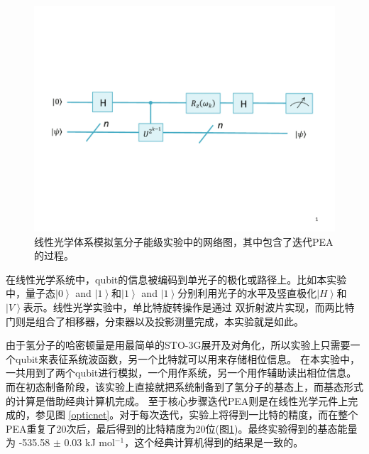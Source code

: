 \begin{figure}[htbp]
            \begin{center}
              \includegraphics[width= 0.8\columnwidth]{figures/simhydro.pdf}
              \caption{线性光学体系模拟氢分子能级实验中的网络图，其中包含了迭代PEA的过程。
               }\label{simhydro}
            \end{center}
 \end{figure}

在线性光学系统中，qubit的信息被编码到单光子的极化或路径上\cite{hydro1}。比如本实验中，量子态$\left\vert 0 \right\rangle$ and
$\left\vert 1 \right\rangle$和$\left\vert 1 \right\rangle$ and
$\left\vert 1 \right\rangle$分别利用光子的水平及竖直极化$\left\vert H \right\rangle$和$\left\vert V \right\rangle$表示。线性光学实验中，单比特旋转操作是通过
双折射波片实现，而两比特门则是组合了相移器，分束器以及投影测量完成，本实验就是如此。

由于氢分子的哈密顿量是用最简单的STO-3G展开及对角化，所以实验上只需要一个qubit来表征系统波函数，另一个比特就可以用来存储相位信息。
在本实验中，一共用到了两个qubit进行模拟，一个用作系统，另一个用作辅助读出相位信息。而在初态制备阶段，该实验上直接就把系统制备到了氢分子的基态上，而基态形式的计算是借助经典计算机完成。
至于核心步骤迭代PEA则是在线性光学元件上完成的，参见图
\ref{opticnet}。对于每次迭代，实验上将得到一比特的精度，而在整个PEA重复了20次后，最后得到的比特精度为20位(图\ref{simhydro})。最终实验得到的基态能量为
-535.58 $\pm$ 0.03 kJ mol$^{-1}$，这个经典计算机得到的结果是一致的。

